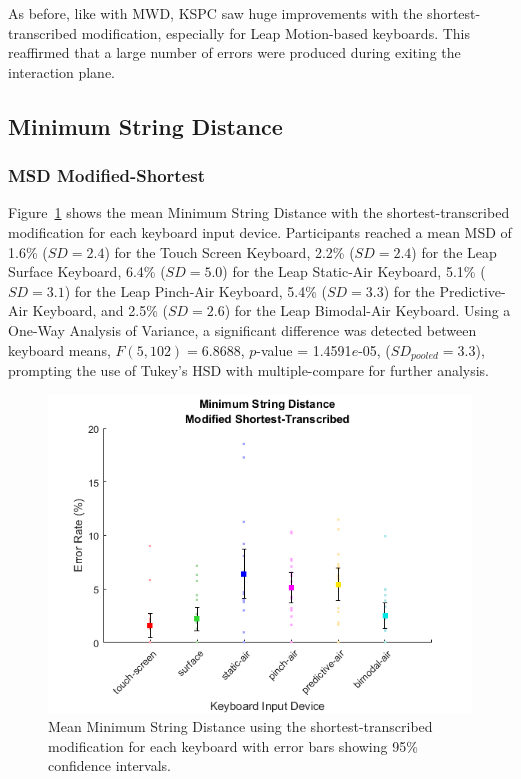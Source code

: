 As before, like with MWD, KSPC saw huge improvements with the shortest-transcribed modification, especially for Leap Motion-based keyboards. This reaffirmed that a large number of errors were produced during exiting the interaction plane.

\subsection{Minimum String Distance}

\subsubsection{MSD Modified-Shortest}
Figure~\ref{fig_MSD_short_mean} shows the mean Minimum String Distance with the shortest-transcribed modification for each keyboard input device. Participants reached a mean MSD of 1.6\% ($SD = 2.4$) for the Touch Screen Keyboard, 2.2\% ($SD = 2.4$) for the Leap Surface Keyboard, 6.4\% ($SD = 5.0$) for the Leap Static-Air Keyboard, 5.1\% ($SD = 3.1$) for the Leap Pinch-Air Keyboard, 5.4\% ($SD = 3.3$) for the Predictive-Air Keyboard, and 2.5\% ($SD = 2.6$) for the Leap Bimodal-Air Keyboard. Using a One-Way Analysis of Variance, a significant difference was detected between keyboard means, $F(5, 102) = 6.8688$, $p$-value = 1.4591$e$-05, ($SD_{pooled} = 3.3$), prompting the use of Tukey's HSD with multiple-compare for further analysis.

\begin{figure}[h]
	\centering
	\includegraphics{fig_MSD_short_mean}
	\caption[Mean Minimum String Distance for Modified-Shortest]{Mean Minimum String Distance using the shortest-transcribed modification for each keyboard with error bars showing 95\% confidence intervals.}
	\label{fig_MSD_short_mean}
\end{figure}

